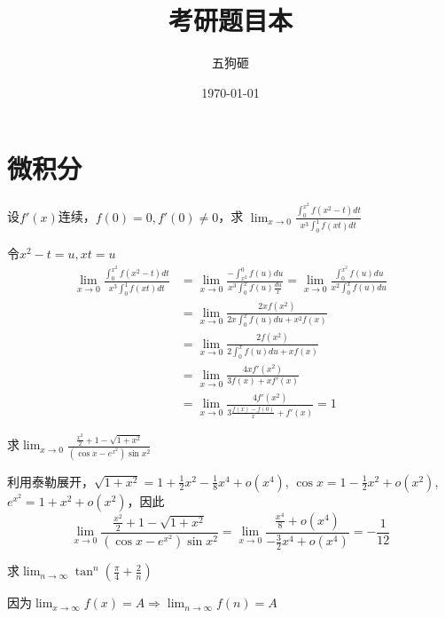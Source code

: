 \documentclass{article}
\author{五狗砸}
\date{\today}
\title{考研题目本}
\begin{document}
\maketitle
\tableofcontents \clearpage
\section{微积分}
\label{sec:orga8507a7}
\begin{examplle}[]
设\(f'(x)\)连续，\(f(0)=0,f'(0)\neq0\)，求
\(\lim_{x\to0}\frac{\int_0^{x^2}f(x^2-t)dt}{x^3\int_0^1f(xt)dt}\)

令\(x^2-t=u,xt=u\)
\begin{align*}
\lim_{x\to0}\frac{\int_0^{x^2}f(x^2-t)dt}{x^3\int_0^1f(xt)dt}&=
\lim_{x\to0}\frac{-\int_{x^2}^0f(u)du}{x^3\int_0^xf(u)\frac{du}{x}}=
\lim_{x\to0}\frac{\int_0^{x^2}f(u)du}{x^2\int_0^xf(u)du}\\
&=\lim_{x\to0}\frac{2xf(x^2)}{2x\int_0^xf(u)du+x^2f(x)}\\
&=\lim_{x\to0}\frac{2f(x^2)}{2\int_0^xf(u)du+xf(x)}\\
&=\lim_{x\to0}\frac{4xf'(x^2)}{3f(x)+xf'(x)}\\
&=\lim_{x\to0}\frac{4f'(x^2)}{3\frac{f(x)-f(0)}{x}+f'(x)}=1
\end{align*}
\end{examplle}

\begin{examplle}[]
求\(\lim_{x\to0}\frac{\frac{x^2}{2}+1-\sqrt{1+x^2}}{(\cos x-e^{x^2})\sin
  x^2}\)

利用泰勒展开，\(\sqrt{1+x^2}=1+\frac{1}{2}x^2-\frac{1}{8}x^4+o(x^4)\),
\(\cos x=1-\frac{1}{2}x^2+o(x^2)\),\(e^{x^2}=1+x^2+o(x^2)\)，因此
\begin{equation*}
\lim_{x\to0}\frac{\frac{x^2}{2}+1-\sqrt{1+x^2}}{(\cos x-e^{x^2})\sin
x^2}=\lim_{x\to0}\frac{\frac{x^4}{8}+o(x^4)}{-\frac{3}{2}x^4+o(x^4)}=-\frac{1}{12}
\end{equation*}
\end{examplle}

\begin{examplle}[]
求\(\lim_{n\to\infty}\tan^n(\frac{\pi}{4}+\frac{2}{n})\)

因为\(\lim_{x\to\infty}f(x)=A\Rightarrow\lim_{n\to\infty}f(n)=A\)
\end{examplle}
\end{document}

